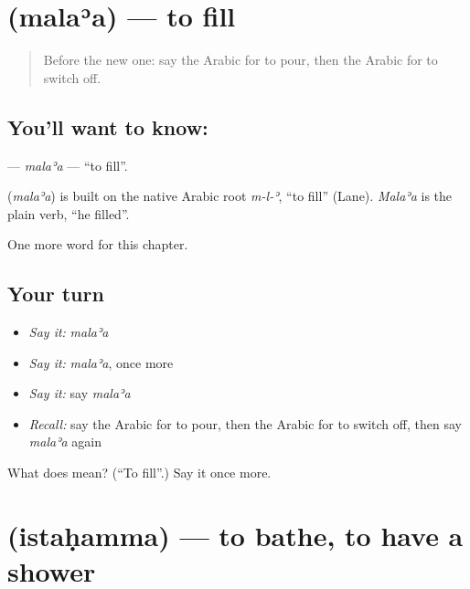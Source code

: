 \section[\texorpdfstring{\ar{ملأ} (malaʾa)}{ملأ (malaʾa)}]{ (malaʾa) — to fill}

\label{lesson:AR-C160-malaa}



\begin{quote}
Before the new one: say the Arabic for to pour, then the Arabic for to switch off.
\end{quote}

\subsection*{You'll want to know: }
\textbf{} — \emph{malaʾa} — \textquotedblleft{}to fill\textquotedblright{}.

\begin{cousinweb}
\textbf{} (\emph{malaʾa}) is built on the native Arabic root \emph{m-l-ʾ}, \textquotedblleft{}to fill\textquotedblright{} (Lane). \emph{Malaʾa} is the plain verb, \textquotedblleft{}he filled\textquotedblright{}.
\end{cousinweb}

\begin{grammarlens}[title={What you've built}]
One more word for this chapter.
\end{grammarlens}

\subsection*{Your turn}
\begin{itemize}
\raggedright
  \item \emph{Say it:} \emph{malaʾa}
  \item \emph{Say it:} \emph{malaʾa}, once more
  \item \emph{Say it:} say \emph{malaʾa}
  \item \emph{Recall:} say the Arabic for to pour, then the Arabic for to switch off, then say \emph{malaʾa} again
\end{itemize}

\begin{tcolorbox}[breakable,colback=teal!4,colframe=teal!35!black,title={Before you move on}]
What does  mean? (\textquotedblleft{}To fill\textquotedblright{}.) Say it once more.
\end{tcolorbox}
\section[\texorpdfstring{\ar{استحم} (istaḥamma)}{استحم (istaḥamma)}]{ (istaḥamma) — to bathe, to have a shower}


